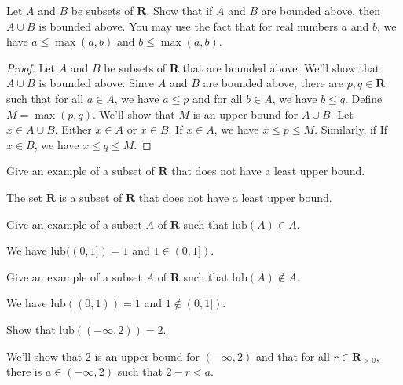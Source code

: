 \documentclass[12pt,fleqn,answers]{exam}
\newcommand{\reals}{\mathbf{R}}
\newcommand{\lub}{\mathrm{lub}}
\newcommand{\quiz}{Review for Exam I}
\newcommand{\term}{Fall}
\begin{document}
\large
\noindent{\textbf \quiz}


\begin{questions} 

\question Let $A$ and $B$ be subsets of $\reals$. Show that if $A$ and $B$ are bounded above,
then $A \cup B$ is bounded above.  You may use the fact that for real numbers $a$ and $b$, we have
$a \leq \max(a,b)$ and $b \leq \max(a,b)$.

\begin{solution}
\begin{proof} Let  $A$ and $B$ be subsets of $\reals$ that are bounded above. We'll show that $A \cup B$ 
is bounded above. Since $A$ and $B$ are bounded above, there are $p,q \in \reals$ such that
for all $a \in A$, we have $a \leq p$ and for all $b \in A$, we have $b \leq q$.  Define $M = \max(p,q)$. 
We'll show that $M$ is an upper bound for $A \cup B$. Let $x \in A \cup B$. Either $x \in A$ or $x \in B$.
If $x \in A$, we have $x \leq p \leq M$. Similarly, if If $x \in B$, we have $x \leq q \leq M$. \qedhere

\end{proof}
\end{solution}

\question Give an example of a subset of $\reals$ that does not have a least upper bound.

\begin{solution} The set $\reals$ is a subset of $\reals$ that does not have a least upper bound.
\end{solution}

\question Give an example of a subset $A$ of $\reals$ such that $\lub(A) \in A$.
\begin{solution} We have $\lub((0,1]) = 1$ and $1 \in (0,1])$.
\end{solution}

\question Give an example of a subset $A$ of $\reals$ such that $\lub(A) \notin A$.
\begin{solution} We have $\lub((0,1)) = 1$ and $1 \notin (0,1])$.
\end{solution}

\question Show that $\lub((-\infty, 2)) = 2$.

\begin{solution} We'll show that 2 is an upper bound for $(-\infty, 2)$ and that for all $r \in \reals_{>0}$, 
there is $a \in (-\infty, 2)$ such that $2 - r < a$.


\end{solution}
\end{questions}
\end{document}
